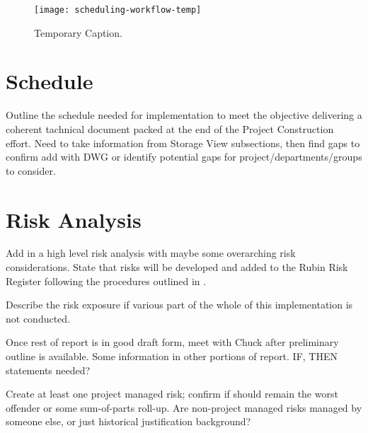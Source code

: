 \begin{figure}[t]
\caption{Temporary Caption.}
\centering
\texttt{[image: scheduling-workflow-temp]}
\label{fig:scheduling-workflow}
\end{figure}

\section{Schedule}

Outline the schedule needed for implementation to meet the objective delivering a coherent tachnical document packed at the end of the Project Construction effort.
Need to take information from Storage View subsections, then find gaps to confirm add with DWG or identify potential gaps for project/departments/groups to consider.


\section{Risk Analysis}

Add in a high level risk analysis with maybe some overarching risk considerations. 
State that risks will be developed and added to the Rubin Risk Register following  the procedures outlined in .

Describe the risk exposure if various part of the whole of this implementation is not conducted.

Once rest of report is in good draft form, meet with Chuck after preliminary outline is available.
Some information in other portions of report.
IF, THEN statements needed?

Create at least one project managed risk; confirm if should remain the worst offender or some sum-of-parts roll-up.
Are non-project managed risks managed by someone else, or just historical justification background?

